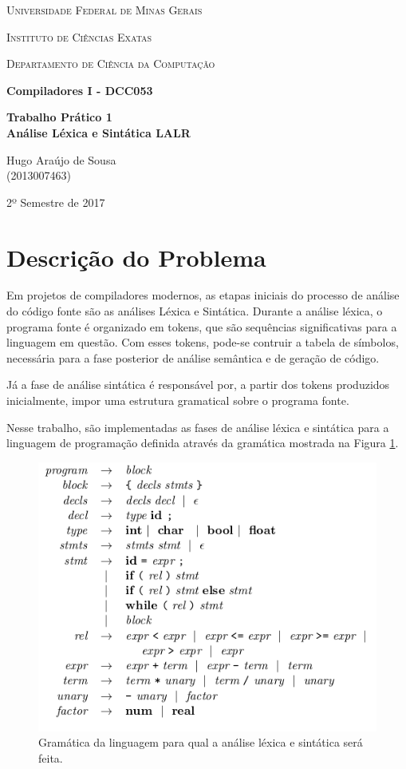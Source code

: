 \documentclass[a4paper,12pt]{report}
\begin{document}
\begin{titlepage}
	\centering
	{\scshape\LARGE Universidade Federal de Minas Gerais \par}
	{\scshape\Large Instituto de Ciências Exatas \par}
	{\scshape\Large Departamento de Ciência da Computação \par}
	\vfill
	{\huge\bfseries \textbf{Compiladores I - DCC053} \par}
	{\huge\bfseries \textbf{Trabalho Prático 1\\Análise Léxica e Sintática LALR} \par}
	\vfill
	{\Large Hugo Araújo de Sousa\\(2013007463)\par}
	\vfill
	{\large 2º Semestre de 2017\par}
\end{titlepage}

\newpage

\section{Descrição do Problema}

Em projetos de compiladores modernos, as etapas iniciais do processo de análise
do código fonte são as análises Léxica e Sintática. Durante a análise léxica, o
programa fonte é organizado em tokens, que são sequências significativas para
a linguagem em questão. Com esses tokens, pode-se contruir a tabela de símbolos,
necessária para a fase posterior de análise semântica e de geração de código.

Já a fase de análise sintática é responsável por, a partir dos tokens produzidos
inicialmente, impor uma estrutura gramatical sobre o programa fonte.

Nesse trabalho, são implementadas as fases de análise léxica e sintática para
a linguagem de programação definida através da gramática mostrada na Figura
\ref{fig:gramatica}.

\begin{figure}[h]
 \centering
 \includegraphics[scale=0.7]{grammar.png}
 \caption{Gramática da linguagem para qual a análise léxica e sintática será feita.}
 \label{fig:gramatica}
\end{figure}
\end{document}
